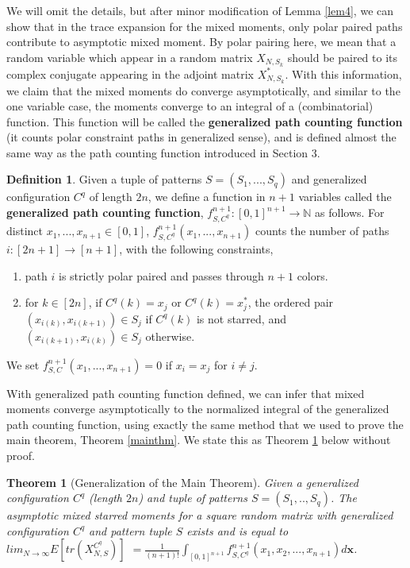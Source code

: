 \documentclass[12pt]{amsart}
\newtheorem{thm}{Theorem}[section]
\theoremstyle{definition}
\newtheorem{defn}{Definition}[section]
\theoremstyle{remark}
\begin{document}
We will omit the details, but after minor modification of Lemma \ref{lem4}, we can show that in the trace expansion for the mixed moments, only polar paired paths contribute to asymptotic mixed moment. By polar pairing here, we mean that a random variable which appear in a random matrix $X_{N,S_k}$ should be paired to its complex conjugate appearing in the adjoint matrix $X_{N,S_k}^*$. With this information, we claim that the mixed moments do converge asymptotically, and similar to the one variable case, the moments converge to an integral of a (combinatorial) function. This function will be called the \textbf{generalized path counting function} (it counts polar constraint paths in generalized sense), and is defined almost the same way as the path counting function introduced in Section 3. 

\begin{defn}

    Given a tuple of patterns $S=(S_1,...,S_q)$ and generalized configuration $C^q$ of length $2n$, we define a function in $n+1$ variables called the \textbf{generalized path counting function}, $f_{S,C^q}^{n+1} : [0,1]^{n+1} \to \mathbb{N}$ as follows. For distinct $x_1,...,x_{n+1} \in [0,1]$, $f_{S,C^q}^{n+1}(x_1,...,x_{n+1})$ counts the number of paths $i:[2n+1] \to [n+1]$, with the following constraints, 
    \begin{enumerate}
    \item path $i$ is strictly polar paired and passes through $n+1$ colors.
        \item  for $k \in [2n]$, if $C^q(k)=x_j$ or $C^q(k)=x_j^*$, the ordered pair $(x_{i(k)},x_{i(k+1)}) \in S_j$ if $C^q(k)$ is not starred, and $(x_{i(k+1)},x_{i(k)}) \in S_j$ otherwise.
    \end{enumerate} 
     We set $f_{S,C}^{n+1}(x_1,...,x_{n+1})=0$ if $x_i=x_j$ for $i \neq j$. \\

\end{defn}


With generalized path counting function defined, we can infer that mixed moments converge asymptotically to the normalized integral of the generalized path counting function, using exactly the same method that we used to prove the main theorem, Theorem \ref{mainthm}. We state this as Theorem \ref{genmainthm} below without proof.

\begin{thm}[Generalization of the Main Theorem] \label{genmainthm}
    Given a generalized configuration $C^q$ (length $2n$) and tuple of patterns $S=(S_1,..,S_q)$. The asymptotic mixed starred moments for a square random matrix with generalized configuration $C^q$ and pattern tuple $S$ exists and is equal to $ lim_{N \to \infty} E[tr(X_{N,S}^{C^q})]$ $= \frac{1}{(n+1)!}\int_{[0,1]^{n+1}}f_{S,C^q}^{n+1}(x_1,x_2,...,x_{n+1})d\mathbf{x}$.
\end{thm}
\end{document}
